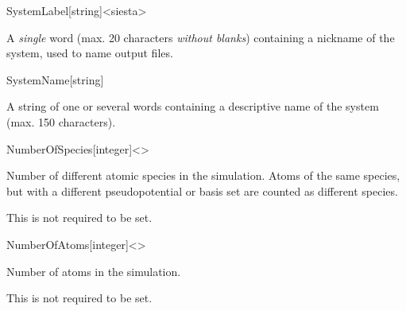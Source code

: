 

\begin{fdfentry}{SystemLabel}[string]<siesta>

    A \emph{single} word (max. 20 characters \emph{without blanks})
    containing a nickname of the system, used to name output files.
  
  \end{fdfentry}
  
  
  \begin{fdfentry}{SystemName}[string]
  
    A string of one or several words containing a descriptive name of
    the system (max. 150 characters).
  
  \end{fdfentry}
  
  
  \begin{fdfentry}{NumberOfSpecies}[integer]<>
  
    Number of different atomic species in the simulation.  Atoms of the
    same species, but with a different pseudopotential or basis set are
    counted as different species.
  
    \note This is not required to be set.
  
  \end{fdfentry}
  
  \begin{fdfentry}{NumberOfAtoms}[integer]<>
  
    Number of atoms in the simulation.
  
    \note This is not required to be set.
  
  \end{fdfentry}
  
